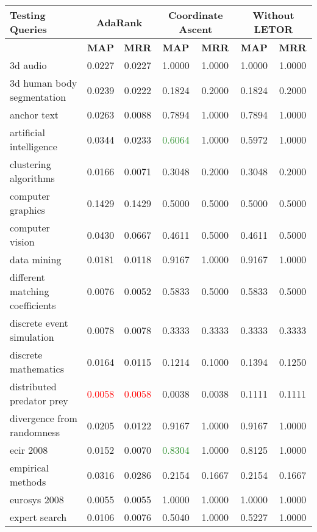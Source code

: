 \begin{table}
\centering
\begin{tabular}{|l|c|c|c|c|c|c|}
\hline \textbf{Testing Queries} & \multicolumn{2}{|c|}{\textbf{AdaRank}} & \multicolumn{2}{|c|}{\textbf{Coordinate Ascent}} & \multicolumn{2}{|c|}{\textbf{Without LETOR}} \\
\hline 				 & \textbf{MAP} & \textbf{MRR}  & \textbf{MAP} & \textbf{MRR}  & \textbf{MAP} & \textbf{MRR} \\
\hline 3d audio & 0.0227 & 0.0227 & 1.0000 & 1.0000 & 1.0000 & 1.0000\\
\hline 3d human body segmentation & 0.0239 & 0.0222 & 0.1824 & 0.2000 & 0.1824 & 0.2000 \\
\hline anchor text & 0.0263 & 0.0088 & 0.7894 & 1.0000 & 0.7894 & 1.0000 \\
\hline artificial intelligence & 0.0344 & 0.0233 & \textcolor{ForestGreen}{0.6064} & 1.0000 & 0.5972 & 1.0000 \\
\hline clustering algorithms & 0.0166 & 0.0071 & 0.3048 & 0.2000 & 0.3048 & 0.2000 \\
\hline computer graphics & 0.1429 & 0.1429 & 0.5000 & 0.5000 & 0.5000 & 0.5000 \\
\hline computer vision & 0.0430 & 0.0667 & 0.4611 & 0.5000 & 0.4611 & 0.5000 \\
\hline data mining & 0.0181 & 0.0118 & 0.9167 & 1.0000 & 0.9167 & 1.0000 \\
\hline different matching coefficients & 0.0076 & 0.0052 & 0.5833 & 0.5000 & 0.5833 & 0.5000 \\
\hline discrete event simulation & 0.0078 & 0.0078 & 0.3333 & 0.3333 & 0.3333 & 0.3333 \\
\hline discrete mathematics & 0.0164 & 0.0115 & 0.1214 & 0.1000 & 0.1394 & 0.1250 \\
\hline distributed predator prey & \textcolor{red}{0.0058} & \textcolor{red}{0.0058} & 0.0038 & 0.0038 & 0.1111 & 0.1111 \\
\hline divergence from randomness & 0.0205 & 0.0122 & 0.9167 & 1.0000 & 0.9167 & 1.0000 \\
\hline ecir 2008 & 0.0152 & 0.0070 & \textcolor{ForestGreen}{0.8304} & 1.0000 & 0.8125 & 1.0000 \\
\hline empirical methods & 0.0316 & 0.0286 & 0.2154 & 0.1667 & 0.2154 & 0.1667 \\
\hline eurosys 2008 & 0.0055 & 0.0055 & 1.0000 & 1.0000 & 1.0000 & 1.0000 \\
\hline expert search & 0.0106 & 0.0076 & 0.5040 & 1.0000 & 0.5227 & 1.0000 \\

\end{tabular}
\end{table}
